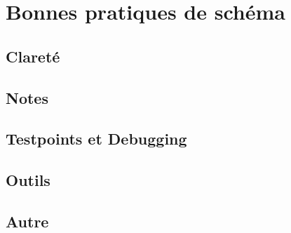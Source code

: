 
\section{Bonnes pratiques de schéma}

\subsection{Clareté}

\subsection{Notes}

\subsection{Testpoints et Debugging}

\subsection{Outils}

\subsection{Autre}
